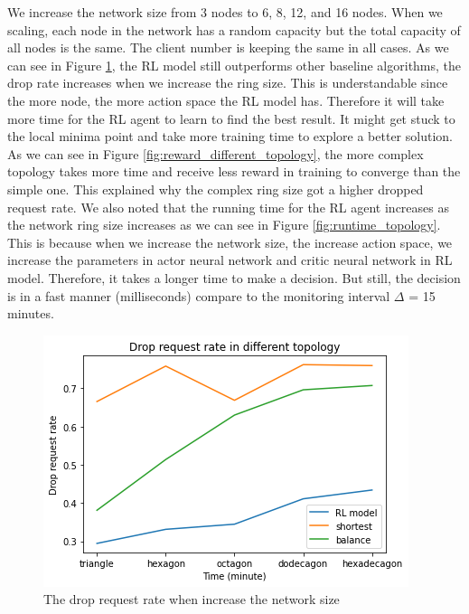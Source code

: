 \documentclass[conference]{IEEEtran}
\begin{document}
We increase the network size from 3 nodes to 6, 8, 12, and 16 nodes. When we scaling, each node in the network has a random capacity but the total capacity of all nodes is the same. The client number is keeping the same in all cases. As we can see in Figure \ref{fig:drop_request_rate_diff_topology}, the RL model still outperforms other baseline algorithms, the drop rate increases when we increase the ring size. This is understandable since the more node, the more action space the RL model has. Therefore it will take more time for the RL agent to learn to find the best result. It might get stuck to the local minima point and take more training time to explore a better solution. As we can see in Figure \ref{fig:reward_different_topology}, the more complex topology takes more time and receive less reward in training to converge than the simple one. This explained why the complex ring size got a higher dropped request rate. We also noted that the running time for the RL agent increases as the network ring size increases as we can see in Figure \ref{fig:runtime_topology}. This is because when we increase the network size, the increase action space, we increase the parameters in actor neural network and critic neural network in RL model. Therefore, it takes a longer time to make a decision. But still, the decision is in a fast manner (milliseconds) compare to the monitoring interval $\Delta$ = 15 minutes.

\begin{figure}[]
    \centering
    \includegraphics[scale = 0.5]{imgs/drop_request_rate_diff_topology.png}
    \caption{The drop request rate when increase the network size}
    \label{fig:drop_request_rate_diff_topology}
\end{figure}
\end{document}
